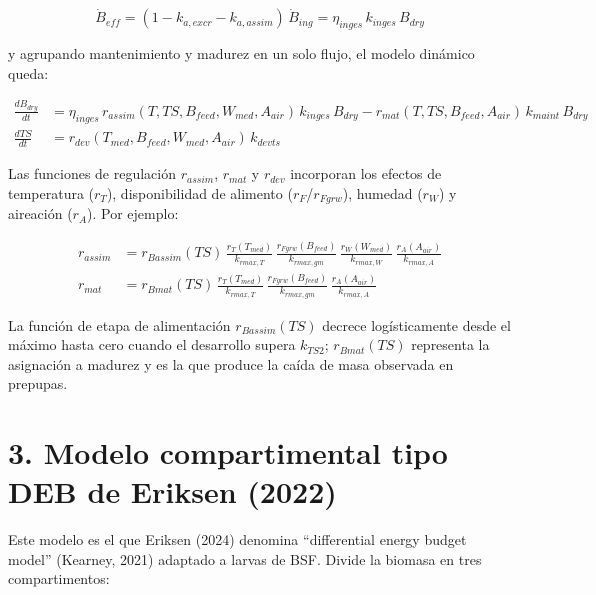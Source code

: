 \documentclass[11pt,a4paper]{article}
\begin{document}
\begin{equation}
    \dot{B}_{eff} = (1 - k_{a,excr} - k_{a,assim})\,\dot{B}_{ing}
    = \eta_{inges}\,k_{inges}\,B_{dry}
    \label{eq:pad_beff}
\end{equation}

y agrupando mantenimiento y madurez en un solo flujo, el modelo dinámico queda:

\begin{align}
    \frac{dB_{dry}}{dt} &=
    \eta_{inges}\,r_{assim}(T, TS, B_{feed}, W_{med}, A_{air})\,k_{inges}\,B_{dry}
    - r_{mat}(T, TS, B_{feed}, A_{air})\,k_{maint}\,B_{dry}
    \label{eq:pad_bdry} \\[6pt]
    \frac{dTS}{dt} &= r_{dev}(T_{med}, B_{feed}, W_{med}, A_{air})\,k_{devts}
    \label{eq:pad_ts}
\end{align}

Las funciones de regulación $r_{assim}$, $r_{mat}$ y $r_{dev}$ incorporan los efectos de temperatura ($r_T$), disponibilidad de alimento ($r_F$/$r_{Fgrw}$), humedad ($r_W$) y aireación ($r_A$). Por ejemplo:

\begin{align}
    r_{assim} &= r_{Bassim}(TS)\,
    \frac{r_T(T_{med})}{k_{rmax,T}}\,
    \frac{r_{Fgrw}(B_{feed})}{k_{rmax,gm}}\,
    \frac{r_W(W_{med})}{k_{rmax,W}}\,
    \frac{r_A(A_{air})}{k_{rmax,A}}
    \label{eq:pad_rassim} \\[6pt]
    r_{mat} &= r_{Bmat}(TS)\,
    \frac{r_T(T_{med})}{k_{rmax,T}}\,
    \frac{r_{Fgrw}(B_{feed})}{k_{rmax,gm}}\,
    \frac{r_A(A_{air})}{k_{rmax,A}}
    \label{eq:pad_rmat}
\end{align}

La función de etapa de alimentación $r_{Bassim}(TS)$ decrece logísticamente desde el máximo hasta cero cuando el desarrollo supera $k_{TS2}$; $r_{Bmat}(TS)$ representa la asignación a madurez y es la que produce la caída de masa observada en prepupas.

\section{3. Modelo compartimental tipo DEB de Eriksen (2022)}

Este modelo es el que Eriksen (2024) denomina ``differential energy budget model'' (Kearney, 2021) adaptado a larvas de BSF. Divide la biomasa en tres compartimentos:
\end{document}
